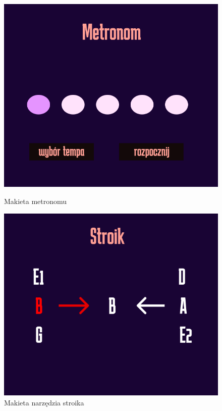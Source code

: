 \begin{figure}[htb]
    \vspace{0.5cm}
    \begin{minipage}[b]{0.4\textwidth}
        \centering
        \includegraphics[width=0.9\linewidth]{rys03/MakMetronom}
        \caption{Makieta metronomu}
        \label{fig:pageLayout3}
    \end{minipage}
    \hspace{0.05\textwidth}
    \begin{minipage}[b]{0.4\textwidth}
        \centering
        \includegraphics[width=0.9\linewidth]{rys03/MakStroik}
        \caption{Makieta narzędzia stroika}
        \label{fig:pageLayout4}
    \end{minipage}
\end{figure}

